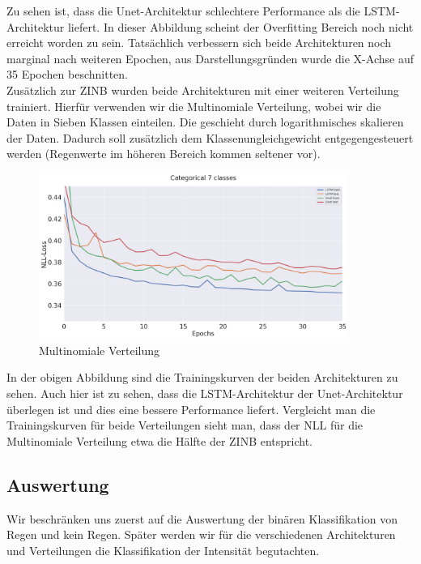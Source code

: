 \noindent Zu sehen ist, dass die Unet-Architektur schlechtere Performance als die LSTM-Architektur liefert. In dieser Abbildung scheint der Overfitting Bereich noch nicht erreicht worden zu sein.
Tatsächlich verbessern sich beide Architekturen noch marginal nach weiteren Epochen, aus Darstellungsgründen wurde die X-Achse auf 35 Epochen beschnitten.\\

\noindent Zusätzlich zur ZINB wurden beide Architekturen mit einer weiteren Verteilung trainiert. Hierfür verwenden wir die Multinomiale Verteilung, wobei wir die Daten in Sieben Klassen einteilen. Die geschieht durch logarithmisches skalieren der Daten. Dadurch soll zusätzlich dem Klassenungleichgewicht entgegengesteuert werden (Regenwerte im höheren Bereich kommen seltener vor). 

\begin{figure}[htb]
 \centering
 \includegraphics[width=0.9\textwidth,angle=0]{abb/loss_multinom.png}
 \caption{Multinomiale Verteilung}
\label{fig:multinomialeVerteilung}
\end{figure}

\noindent In der obigen Abbildung sind die Trainingskurven der beiden Architekturen zu sehen. Auch hier ist zu sehen, dass die LSTM-Architektur der Unet-Architektur überlegen ist und dies eine bessere Performance liefert. Vergleicht man die Trainingskurven für beide Verteilungen sieht man, dass der NLL für die Multinomiale Verteilung etwa die Hälfte der ZINB entspricht.

\subsection{Auswertung}

Wir beschränken uns zuerst auf die Auswertung der binären Klassifikation von Regen und kein Regen. Später werden wir für die verschiedenen Architekturen und Verteilungen die Klassifikation der Intensität begutachten.

